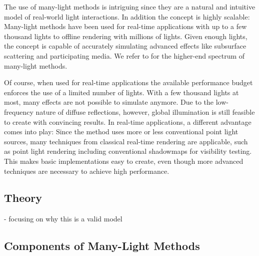 
The use of many-light methods is intriguing since they are a natural and intuitive model of real-world light interactions. In addition the concept is highly scalable: Many-light methods have been used for real-time applications with up to a few thousand lights to offline rendering with millions of lights. Given enough lights, the concept is capable of accurately simulating advanced effects like subsurface scattering and participating media. We refer to \citet{Dachsbacher:2014:ManyLightsSTAR} for the higher-end spectrum of many-light methods.

Of course, when used for real-time applications the available performance budget enforces the use of a limited number of lights. With a few thousand lights at most, many effects are not possible to simulate anymore. Due to the low-frequency nature of diffuse reflections, however, global illumination is still feasible to create with convincing results. In real-time applications, a different advantage comes into play: Since the method uses more or less conventional point light sources, many techniques from classical real-time rendering are applicable, such as point light rendering including conventional shadowmaps for visibility testing. This makes basic implementations easy to create, even though more advanced techniques are necessary to achieve high performance.


\subsection{Theory}
- focusing on why this is a valid model


\subsection{Components of Many-Light Methods}

